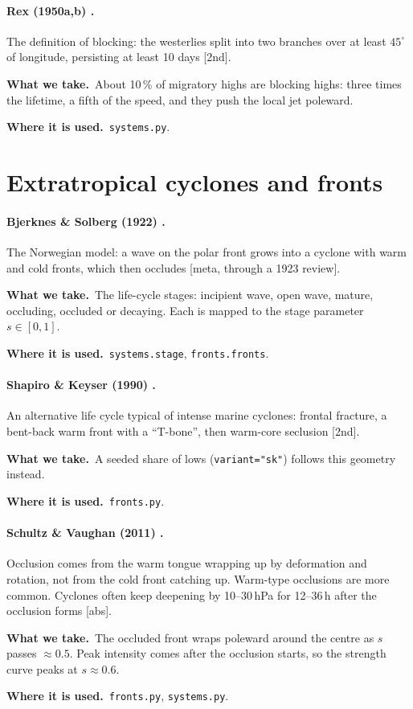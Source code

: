 \documentclass[11pt,a4paper]{article}
\newcommand{\verif}[1]{\textsf{\small[#1]}}
\newcommand{\takes}{\par\noindent\textbf{What we take.}\ }
\newcommand{\used}{\par\noindent\textbf{Where it is used.}\ }
\begin{document}
\paragraph{Rex (1950a,b) \cite{rex1950a,rex1950b}.}
The definition of blocking: the westerlies split into two branches over at least
$45^\circ$ of longitude, persisting at least 10 days \verif{2nd}.
\takes About 10\,\% of migratory highs are blocking highs: three times the lifetime, a fifth
of the speed, and they push the local jet poleward.
\used \texttt{systems.py}.

\section{Extratropical cyclones and fronts}

\paragraph{Bjerknes \& Solberg (1922) \cite{bjerknes1922}.}
The Norwegian model: a wave on the polar front grows into a cyclone with warm and cold
fronts, which then occludes \verif{meta, through a 1923 review}.
\takes The life-cycle stages: incipient wave, open wave, mature, occluding,
occluded or decaying. Each is mapped to the stage parameter $s\in[0,1]$.
\used \texttt{systems.stage}, \texttt{fronts.fronts}.

\paragraph{Shapiro \& Keyser (1990) \cite{shapiro1990}.}
An alternative life cycle typical of intense marine cyclones: frontal fracture, a bent-back
warm front with a ``T-bone'', then warm-core seclusion \verif{2nd}.
\takes A seeded share of lows (\texttt{variant="sk"}) follows this geometry instead.
\used \texttt{fronts.py}.

\paragraph{Schultz \& Vaughan (2011) \cite{schultz2011}.}
Occlusion comes from the warm tongue wrapping up by deformation and rotation, not from the
cold front catching up. Warm-type occlusions are more common. Cyclones often keep deepening
by 10--30\,hPa for 12--36\,h after the occlusion forms \verif{abs}.
\takes The occluded front wraps poleward around the centre as $s$ passes
$\approx0.5$. Peak intensity comes after the occlusion starts, so the strength curve peaks
at $s\approx0.6$.
\used \texttt{fronts.py}, \texttt{systems.py}.
\end{document}
